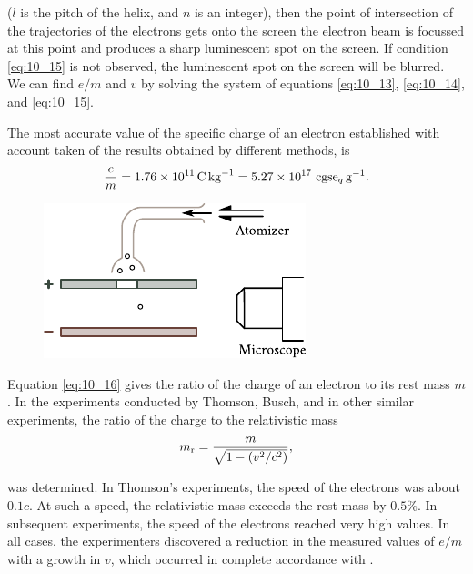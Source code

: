 \noindent
($l$ is the pitch of the helix, and $n$ is an integer), then the point of intersection of the trajectories of the electrons gets onto the screen the electron beam is focussed at this point and produces a sharp luminescent spot on the screen.
If condition \eqref{eq:10_15} is not observed, the luminescent spot on the screen will be blurred.
We can find $e/m$ and $v$ by solving the system of equations \eqref{eq:10_13}, \eqref{eq:10_14}, and
\eqref{eq:10_15}.

The most accurate value of the specific charge of an electron established with account taken of the results obtained by different methods, is
\begin{equation}\label{eq:10_16}
    \frac{e}{m} = \SI{1.76e11}{\coulomb\per\kilo\gram} = \num{5.27e17} \text{~cgse$_{q}$}\,\si{\per\gram}.
\end{equation}

\begin{figure}[t]
	\begin{center}
		\includegraphics[scale=1]{figures/ch_10/fig_10_8.pdf}
		\caption[]{}
		\label{fig:10_8}
	\end{center}
	\vspace{-0.8cm}
\end{figure}

Equation \eqref{eq:10_16} gives the ratio of the charge of an electron to its rest mass $m$.
In the experiments conducted by Thomson, Busch, and in other similar experiments, the ratio of the charge to the relativistic mass
\begin{equation}\label{eq:10_17}
    m_{\text{r}} = \frac{m}{\sqrt{1 - \left(v^2/c^2\right)}},
\end{equation}

\noindent
was determined.
In Thomson's experiments, the speed of the electrons was about $0.1c$.
At such a speed, the relativistic mass exceeds the rest mass by $0.5\%$.
In subsequent experiments, the speed of the electrons reached very high values.
In all cases, the experimenters discovered a reduction in the measured values of $e/m$ with a growth in $v$, which occurred in complete accordance with .

